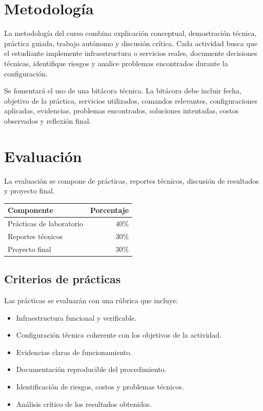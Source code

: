 \documentclass[
  coursetitle={Cómputo Nube y Tecnologías Emergentes},
  coursehours={96},
  coursedate={Verano 2026},
  doctype={Guía del curso},
  otherlangs={english,french},
  authorname={Lázaro},
  authorsurname={Bustio-Martínez},
  authortitle={PhD},
  role={Profesor Investigador},
  email={lbustio@inaoe.mx},
  phone={5559504000},
  ext={7459},
  institution={Instituto Nacional de Astrofísica, Óptica y Electrónica (INAOE)},
  department={Maestría en Ciencias en Tecnologías de Seguridad},
  address={Luis Enrique Erro 1, Sta. Ma. Tonantzintla, San Andrés Cholula, CP 72840, Puebla, México},
  margin={0.5in}
]{../../lbustio_lecture_notes}
\begin{document}
\section{Metodología}
La metodología del curso combina explicación conceptual, demostración técnica, práctica guiada, trabajo autónomo y discusión crítica. Cada actividad busca que el estudiante implemente infraestructura o servicios reales, documente decisiones técnicas, identifique riesgos y analice problemas encontrados durante la configuración.

Se fomentará el uso de una bitácora técnica. La bitácora debe incluir fecha, objetivo de la práctica, servicios utilizados, comandos relevantes, configuraciones aplicadas, evidencias, problemas encontrados, soluciones intentadas, costos observados y reflexión final.

\section{Evaluación}
La evaluación se compone de prácticas, reportes técnicos, discusión de resultados y proyecto final.

\begin{center}
\begin{tabular}{l r}
\hline
Componente & Porcentaje \\
\hline
Prácticas de laboratorio & 40\% \\
Reportes técnicos & 30\% \\
Proyecto final & 30\% \\
\hline
\end{tabular}
\end{center}

\subsection{Criterios de prácticas}
Las prácticas se evaluarán con una rúbrica que incluye:
\begin{itemize}
  \item Infraestructura funcional y verificable.
  \item Configuración técnica coherente con los objetivos de la actividad.
  \item Evidencias claras de funcionamiento.
  \item Documentación reproducible del procedimiento.
  \item Identificación de riesgos, costos y problemas técnicos.
  \item Análisis crítico de los resultados obtenidos.
\end{itemize}
\end{document}
